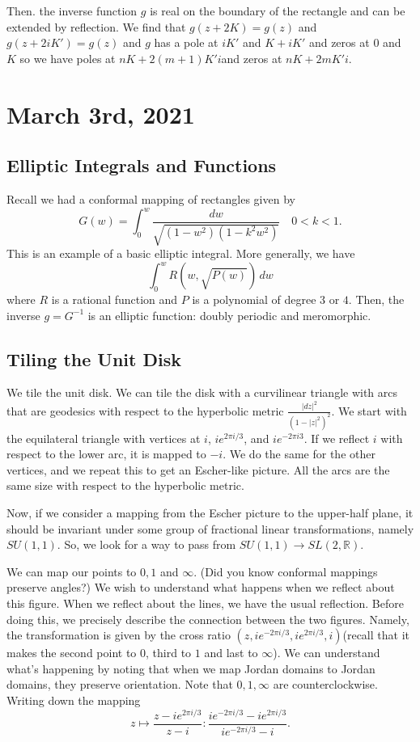 \documentclass[12pt]{scrartcl}
\newcommand{\R}{\mathbb{R}}
\begin{document}
Then. the inverse function $g$ is real on the boundary of the rectangle and can be extended by reflection.  We find that $g(z + 2K) = g(z)$ and $g(z + 2iK') = g(z)$ and $g$ has a pole at $iK'$ and $K + iK'$ and zeros at $0$ and $K$ so we have poles at $nK + 2(m+1)K' i$and zeros at $nK+2mK'i$.

\pagebreak
\section{March 3rd, 2021}
\subsection{Elliptic Integrals and Functions}
Recall we had a conformal mapping of rectangles given by $$G(w) = \int_0^w \frac{dw}{\sqrt{(1 - w^2)(1 - k^2w^2)}} \quad 0 < k < 1.$$
This is an example of a basic elliptic integral.  More generally, we have 
$$\int_0^w R(w, \sqrt{P(w)}) \,dw$$
where $R$ is a rational function and $P$ is a polynomial of degree $3$ or $4$.  Then, the inverse $g = G^{-1}$ is an elliptic function: doubly periodic and meromorphic.  

\subsection{Tiling the Unit Disk}
We tile the unit disk.  We can tile the disk with a curvilinear triangle with arcs that are geodesics with respect to the hyperbolic metric $\frac{|dz|^2}{(1 - |z|^2)^2}$.  We start with the equilateral triangle with vertices at $i$, $i e^{2\pi i/3}$, and $i e^{-2\pi i 3}$.  If we reflect $i$ with respect to the lower arc, it is mapped to $-i$.  We do the same for the other vertices, and we repeat this to get an Escher-like picture.  All the arcs are the same size with respect to the hyperbolic metric.

Now, if we consider a mapping from the Escher picture to the upper-half plane, it should be invariant under some group of fractional linear transformations, namely $SU(1, 1)$.  So, we look for a way to pass from $SU(1, 1) \to SL(2, \R)$.

We can map our points to $0, 1$ and $\infty$.  (Did you know conformal mappings preserve angles?)  We wish to understand what happens when we reflect about this figure.  When we reflect about the lines, we have the usual reflection.  Before doing this, we precisely describe the connection between the two figures.  Namely, the transformation is given by the cross ratio $(z, ie^{-2\pi i/3}, ie^{2\pi i/3}, i)$(recall that it makes the second point to $0$, third to $1$ and last to $\infty$).  We can understand what's happening by noting that when we map Jordan domains to Jordan domains, they preserve orientation.  Note that $0, 1, \infty$ are counterclockwise.  Writing down the mapping
$$z \mapsto \frac{z - ie^{2\pi i/3}}{z - i} : \frac{ie^{-2\pi i/3} - ie^{2\pi i/3}}{ie^{-2 \pi i/3} - i}.$$
\end{document}
